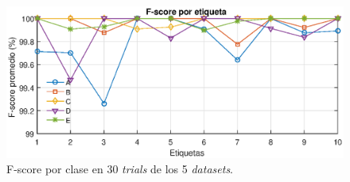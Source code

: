 \documentclass[12pt]{article}%
\begin{document}
\begin{figure}[ht]
  \centering
    \includegraphics[scale=0.9]{./Fsc.eps}
  \caption{F-score por clase en 30 \textit{trials} de los 5 \textit{datasets}.}
  \label{fig:fsc}
\end{figure}
\end{document}
